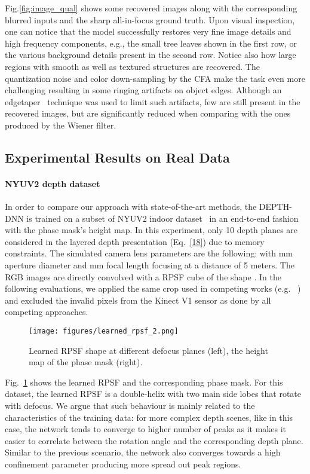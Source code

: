 \documentclass[preprint,5p,twocolumn]{elsarticle}
\begin{document}
Fig.\ref{fig:image_qual} shows some recovered images along with the corresponding blurred inputs and the sharp all-in-focus ground truth. Upon visual inspection, one can notice that the model successfully restores very fine image details and high frequency components, e.g., the small tree leaves shown in the first row, or the various background details present in the second row. Notice also how large regions with smooth as well as textured structures are recovered. The quantization noise and color down-sampling by the CFA make the task even more challenging resulting in some ringing artifacts on object edges.
Although an edgetaper~\cite{reeves2005fast} technique was used to limit such artifacts, few are still present in the recovered images, but are significantly reduced when comparing with the ones produced by the Wiener filter. 

\subsection{Experimental Results on Real Data}


\paragraph{NYUV2 depth dataset}


In order to compare our approach with state-of-the-art methods, the DEPTH-DNN is trained on a subset of NYUV2 indoor dataset~\cite{eigen2014depth} in an end-to-end fashion with the phase mask's height map. In this experiment, only 10 depth planes are considered in the layered depth presentation (Eq.~\ref{18}) due to memory constraints. The simulated camera lens parameters are the following:  with   mm aperture diameter and  mm focal length focusing at a distance of 5 meters. The RGB images are directly convolved with a RPSF cube of the shape . 
In the following evaluations,  we applied the same crop used in competing works (e.g. ~\cite{eigen2015predicting}) and excluded the invalid pixels from the Kinect V1 sensor as done by all competing approaches. 

\begin{figure}[h!]
\centering
\texttt{[image: figures/learned\_rpsf\_2.png]}
\caption{Learned RPSF shape at different defocus planes (left), the height map of the phase mask (right).}
\label{fig:learndedrpsf2}
\end{figure}

Fig.~\ref{fig:learndedrpsf2} shows the learned RPSF and the corresponding phase mask. For this dataset, the learned RPSF is a double-helix  with two main side lobes that rotate with defocus. We argue that such behaviour is mainly related to the characteristics of the training data: for more complex depth scenes, like in this case, the network tends to converge to higher number of peaks as it makes it easier to correlate between the rotation angle and the corresponding depth plane. Similar to the previous  scenario, the network also converges towards a high confinement parameter  producing more spread out peak regions.   
\end{document}
